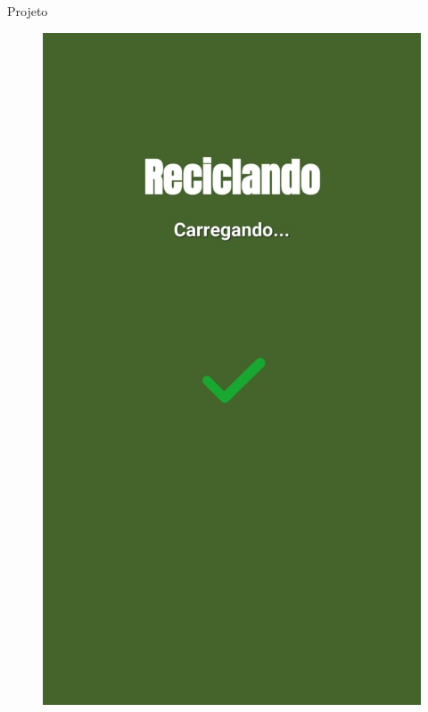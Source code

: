 \documentclass[
	12pt,				%
	openany,			%
	twoside,			%
	a4paper,			%
	english,			%
	french,				%
	spanish,			%
	brazil				%
	]{abntex2}
\begin{document}
\begin{chapter}{Projeto}
\begin{figure}[htb]
\begin{minipage}{0.45\textwidth}
    \includegraphics[scale=0.35]{media/tela_splash_2.jpg}
     \label{fig:tela_splash_2_app}
  \end{minipage}
\end{figure}

\newpage

\end{chapter}
\end{document}
